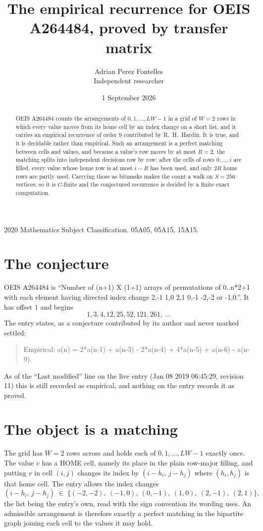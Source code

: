 \documentclass[11pt,a4paper]{article}
\title{The empirical recurrence for OEIS A264484, proved by transfer matrix}
\author{Adrian Perez Fontelles\\ \small Independent researcher}
\date{1 September 2026}
\theoremstyle{plain}
\theoremstyle{definition}
\begin{document}
\maketitle

\begin{abstract}
OEIS A264484 counts the arrangements of $0,1,\dots,LW-1$ in a grid of $W=2$ rows in which
every value moves from its home cell by an index change on a short list, and it carries an
empirical recurrence of order $9$ contributed by R.~H.~Hardin. It is true, and it is
decidable rather than empirical. Such an arrangement is a perfect matching between cells and
values, and because a value's row moves by at most $R=2$, the matching splits into
independent decisions row by row: after the cells of rows $0,\dots,i$ are filled,
every value whose home row is at most $i-R$ has been used, and only $2R$ home rows are
partly used. Carrying those as bitmasks makes the count a walk on $S=256$ vertices, so it is
$C$-finite and the conjectured recurrence is decided by a finite exact computation.
\end{abstract}

\noindent\small 2020 Mathematics Subject Classification. 05A05, 05A15, 15A15.\normalsize

\section{The conjecture}

OEIS A264484 is ``Number of (n+1) X (1+1) arrays of permutations of 0..n*2+1 with each element having directed index change 2,-1 1,0 2,1 0,-1 -2,-2 or -1,0.''. It has offset $1$ and begins
\[
1, 3, 4, 12, 25, 52, 121, 261,\ \dots
\]
The entry states, as a conjecture contributed by its author and never marked settled:
\begin{quote}
Empirical: a(n) = 2*a(n-1) + a(n-3) - 2*a(n-4) + 4*a(n-5) + a(n-6) - a(n-9).
\end{quote}
As of the ``Last modified'' line on the live entry (Jan 08 2019 06:45:29, revision 11) this is still
recorded as empirical, and nothing on the entry records it as proved.

\section{The object is a matching}

The grid has $W=2$ rows across and holds each of $0,1,\dots,LW-1$ exactly once. The value
$v$ has a HOME cell, namely its place in the plain row-major filling, and putting $v$ in cell
$(i,j)$ changes its index by $(i-h_i,\,j-h_j)$ where $(h_i,h_j)$ is that home cell. The entry
allows the index changes
\[
(i-h_i,\,j-h_j)\;\in\;\{(-2,-2),\ (-1,0),\ (0,-1),\ (1,0),\ (2,-1),\ (2,1)\},
\]
the list being the entry's own, read with the sign convention its wording uses. An admissible
arrangement is therefore exactly a perfect matching in the bipartite graph joining each cell to
the values it may hold.
\end{document}
